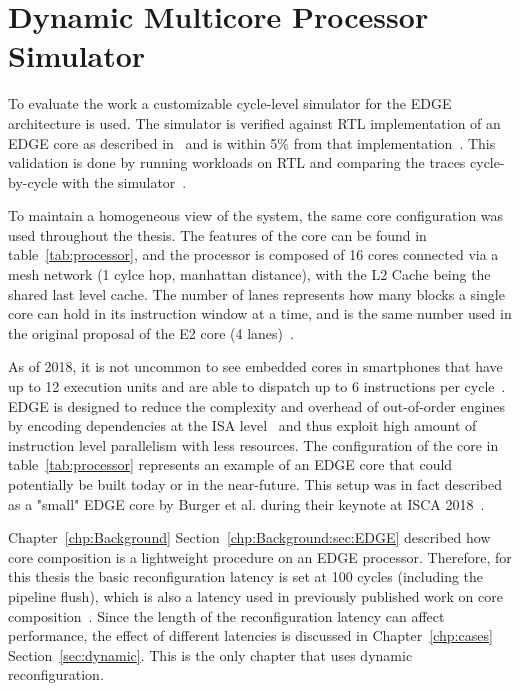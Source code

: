 \section{Dynamic Multicore Processor Simulator}\label{chp:setup:conf}

To evaluate the work a customizable cycle-level simulator for the EDGE architecture is used.
The simulator is verified against RTL implementation of an EDGE core as described in~\cite{putnam2010e2} and is within 5\% from that implementation~\cite{micolet2016dmpstream}.
This validation is done by running workloads on RTL and comparing the traces cycle-by-cycle with the simulator~\cite{micolet2017cases}.

To maintain a homogeneous view of the system, the same core configuration was used throughout the thesis.
The features of the core can be found in table~\ref{tab:processor}, and the processor is composed of 16 cores connected via a mesh network (1 cylce hop, manhattan distance), with the L2 Cache being the shared last level cache.
The number of lanes represents how many blocks a single core can hold in its instruction window at a time, and is the same number used in the original proposal of the E2 core (4 lanes)~\cite{putnam2010e2}.

As of 2018, it is not uncommon to see embedded cores in smartphones that have up to 12 execution units and are able to dispatch up to 6 instructions per cycle~\cite{samsung2018,apple}.
EDGE is designed to reduce the complexity and overhead of out-of-order engines by encoding dependencies at the ISA level~\cite{kim2007tflex,gray2018edge} and thus exploit high amount of instruction level parallelism with less resources.
The configuration of the core in table~\ref{tab:processor} represents an example of an EDGE core that could potentially be built today or in the near-future.
This setup was in fact described as a "small" EDGE core by Burger et al. during their keynote at ISCA 2018~\cite{iscakeynote,e2thereg,twitter}.

Chapter~\ref{chp:Background} Section~\ref{chp:Background:sec:EDGE} described how core composition is a lightweight procedure on an EDGE processor.
Therefore, for this thesis the basic reconfiguration latency is set at 100 cycles (including the pipeline flush), which is also a latency used in previously published work on core composition~\cite{pricopi2012bahurupi}.
Since the length of the reconfiguration latency can affect performance, the effect of different latencies is discussed in Chapter~\ref{chp:cases} Section~\ref{sec:dynamic}.
This is the only chapter that uses dynamic reconfiguration.
 
